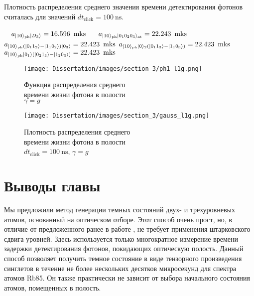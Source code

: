 Плотность распределения среднего значения времени детектирования фотонов считалась для значений $dt_{\mathop{\text{click}}} = 100~\text{ns}$.
\begin{flushleft}
	\qquad\qquad~~$a_{|10\ra_{\text{ph}}|D_3\ra} = 16.596\ \mathop{\text{mks}}$ \qquad\qquad\qquad~~ $a_{|10\rangle_{\text{ph}}|0_{1}0_{2}0_{3}\rangle_{\text{at}}} = 22.243\ \mathop{\text{mks}}$\\
	$a_{|10\rangle_{\text{ph}}(|0_{1}1_{2}\rangle-|1_{1}0_{2}\rangle)|0_{3}\rangle} = 22.423\ \mathop{\text{mks}}$ \qquad\qquad $a_{|10\rangle_{\text{ph}}|0\rangle_{2}(|0_{1}1_{3}\rangle-|1_{1}0_{3}\rangle)} = 22.423\ \mathop{\text{mks}}$\\ 
	$a_{|10\rangle_{\text{ph}}|0_{1}\rangle(|0_{2}1_{3}\rangle-|1_{2}0_{3}\rangle)} = 22.423\ \mathop{\text{mks}}$
\end{flushleft}
\begin{figure}[h!]
	\texttt{[image: Dissertation/images/section\_3/ph1\_l1g.png]}
	\captionsetup{format=hang,width=0.9\textwidth,justification=centering,singlelinecheck=no}
	\caption{
		Функция распределения среднего\\ \hspace{7em}времени жизни фотона в полости\\ 
		$\gamma = g$
	}
	\label{fig:csignga}
\end{figure}

\clearpage
\begin{figure}[h!]
	\noindent\centering\texttt{[image: Dissertation/images/section\_3/gauss\_l1g.png]}
	\captionsetup{format=hang,width=0.9\textwidth,justification=centering,singlelinecheck=no}
	\caption{
		Плотность распределения среднего\\ \hspace{6em}времени жизни фотона в полости\\
		\hspace{6em}$dt_{\text{click}}= 100~\text{ns}$, $\gamma = g$
	}
	\label{fig:csignga1}
\end{figure}
\vspace{-3em}
\section{Выводы главы}\label{sec:ch3/sect5}
\vspace{-3em}
Мы предложили метод генерации темных состояний двух- и трехуровневых атомов, основанный на оптическом отборе. Этот способ очень прост, но, в отличие от предложенного ранее в работе \cite{dark_states_properties_tanamoto}, не требует применения штарковского сдвига уровней. Здесь используется только многократное измерение времени задержки детектирования фотонов, покидающих оптическую полость. Данный способ позволяет получить темное состояние в виде тензорного произведения синглетов в течение не более нескольких десятков микросекунд для спектра атомов Rb85. Он также практически не зависит от выбора начального состояния атомов, помещенных в полость.

